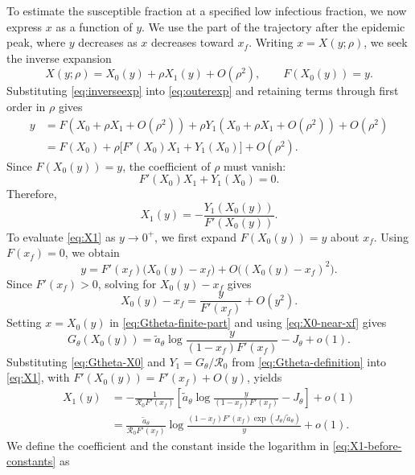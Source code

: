 \documentclass[11pt]{article}
\newcommand{\Rzero}{\mathcal R_0}
\newcommand{\rhoeps}{\rho}
\newcommand{\xf}{x_f}
\begin{document}
To estimate the susceptible fraction at a specified low infectious fraction, we now express \(x\) as a function of \(y\). We use the part of the trajectory after the epidemic peak, where \(y\) decreases as \(x\) decreases toward \(\xf\). Writing \(x=X(y;\rhoeps)\), we seek the inverse expansion
\begin{equation}
X(y;\rhoeps)=X_0(y)+\rhoeps X_1(y)+O(\rhoeps^2),
\qquad F(X_0(y))=y.
\label{eq:inverseexp}
\end{equation}
Substituting \cref{eq:inverseexp} into \cref{eq:outerexp} and retaining terms through first order in \(\rhoeps\) gives
\[
\begin{aligned}
y
&=F(X_0+\rhoeps X_1+O(\rhoeps^2))
+\rhoeps Y_1(X_0+\rhoeps X_1+O(\rhoeps^2))+O(\rhoeps^2)\\
&=F(X_0)+\rhoeps\bigl[F'(X_0)X_1+Y_1(X_0)\bigr]+O(\rhoeps^2).
\end{aligned}
\]
Since \(F(X_0(y))=y\), the coefficient of \(\rhoeps\) must vanish:
\[
F'(X_0)X_1+Y_1(X_0)=0.
\]
Therefore,
\begin{equation}
X_1(y)=-\frac{Y_1(X_0(y))}{F'(X_0(y))}.
\label{eq:X1}
\end{equation}
To evaluate \cref{eq:X1} as \(y\to0^+\), we first expand \(F(X_0(y))=y\) about \(\xf\). Using \(F(\xf)=0\), we obtain
\[
y=F'(\xf)\bigl(X_0(y)-\xf\bigr)+O\bigl((X_0(y)-\xf)^2\bigr).
\]
Since \(F'(\xf)>0\), solving for \(X_0(y)-\xf\) gives
\begin{equation}
X_0(y)-\xf=\frac{y}{F'(\xf)}+O(y^2).
\label{eq:X0-near-xf}
\end{equation}
Setting \(x=X_0(y)\) in \cref{eq:Gtheta-finite-part} and using \cref{eq:X0-near-xf} gives
\begin{equation}
G_\theta(X_0(y))=\widetilde a_\theta\log\frac{y}{(1-\xf)F'(\xf)}-J_\theta+o(1).
\label{eq:Gtheta-X0}
\end{equation}
Substituting \cref{eq:Gtheta-X0} and \(Y_1=G_\theta/\Rzero\) from \cref{eq:Gtheta-definition} into \cref{eq:X1}, with \(F'(X_0(y))=F'(\xf)+O(y)\), yields
\begin{equation}
\begin{aligned}
X_1(y)
&=-\frac{1}{\Rzero F'(\xf)}\left[\widetilde a_\theta\log\frac{y}{(1-\xf)F'(\xf)}-J_\theta\right]+o(1)\\
&=\frac{\widetilde a_\theta}{\Rzero F'(\xf)}
\log\frac{(1-\xf)F'(\xf)\exp(J_\theta/\widetilde a_\theta)}{y}+o(1).
\end{aligned}
\label{eq:X1-before-constants}
\end{equation}
We define the coefficient and the constant inside the logarithm in \cref{eq:X1-before-constants} as
\end{document}
